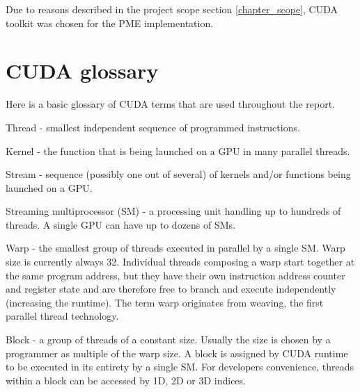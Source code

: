 \documentclass[12pt,a4paper]{report}
\begin{document}
Due to reasons described in the project scope section \ref{chapter_scope}, CUDA toolkit was chosen for the PME implementation. 


\section{CUDA glossary}
Here is a basic glossary of CUDA terms that are used throughout the report.
 

Thread - smallest independent sequence of programmed instructions.

Kernel - the function that is being launched on a GPU in many parallel threads.

Stream - sequence (possibly one out of several) of kernels and/or functions being launched on a GPU.

Streaming multiprocessor (SM) - a processing unit handling up to hundreds of threads. A single GPU can have up to dozens of SMs.

Warp - the smallest group of threads executed in parallel by a single SM. Warp size is currently always 32. Individual threads composing a warp start together at the same program address, but they have their own instruction address counter and register state and are therefore free to branch and execute independently (increasing the runtime). The term warp originates from weaving, the first parallel thread technology. 

Block - a group of threads of a constant size. Usually the size is chosen by a programmer as multiple of the warp size. A block is assigned by CUDA runtime to be executed in its entirety by a single SM. For developers convenience, threads within a block can be accessed by 1D, 2D or 3D indices.
\end{document}
